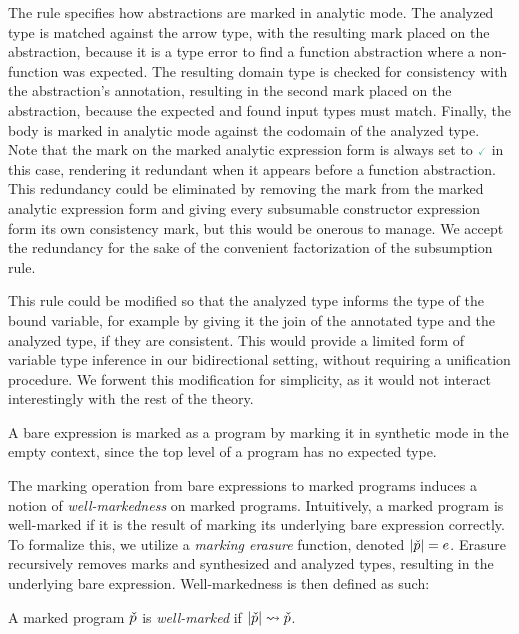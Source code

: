 The  rule specifies how abstractions are marked in analytic mode. The analyzed type is matched against the arrow type, with the resulting mark placed on the abstraction, because it is a type error to find a function abstraction where a non-function was expected. The resulting domain type is checked for consistency with the abstraction's annotation, resulting in the second mark placed on the abstraction, because the expected and found input types must match. Finally, the body is marked in analytic mode against the codomain of the analyzed type. Note that the mark on the marked analytic expression form is always set to $\MGood$ in this case, rendering it redundant when it appears before a function abstraction. This redundancy could be eliminated by removing the mark from the marked analytic expression form and giving every subsumable constructor expression form its own consistency mark, but this would be onerous to manage. We accept the redundancy for the sake of the convenient factorization of the subsumption rule. 

This rule could be modified so that the analyzed type informs the type of the bound variable, for example by giving it the join of the annotated type and the analyzed type, if they are consistent. This would provide a limited form of variable type inference in our bidirectional setting, without requiring a unification procedure. We forwent this modification for simplicity, as it would not interact interestingly with the rest of the theory. 

A bare expression is marked as a program by marking it in synthetic mode in the empty context, since the top level of a program has no expected type. 

The marking operation from bare expressions to marked programs induces a notion of \textit{well-markedness} on marked programs. Intuitively, a marked program is well-marked if it is the result of marking its underlying bare expression correctly. To formalize this, we utilize a \textit{marking erasure} function, denoted $|\check{p}|=e$. Erasure recursively removes marks and synthesized and analyzed types, resulting in the underlying bare expression. Well-markedness is then defined as such:

\begin{definition}
    A marked program $\check{p}$ is \textit{well-marked} if $|\check{p}|\leadsto\check{p}$.
\end{definition}

